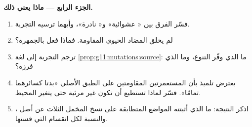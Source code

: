 \begin{problem}
\medskip
\noindent\textbf{الجزء الرابع --- ماذا يعني ذلك.}
\begin{enumerate}[resume]
  \item فسّر الفرق بين « عشوائية» و« نادرة»، وأيهما
        ترسيه التجربة.
  \item لم يخلق المضاد الحيوي المقاومة. فماذا فعل بالجمهرة؟
  \item ترجم التجربة إلى لغة \cref{prop:g11:mutations:source}: ما الذي
        وفّر التنوع، وما الذي فرزه؟
  \item يعترض تلميذ بأن المستعمرتين المقاومتين على الطبق الأصلي «بدتا
        كسائرهما تمامًا». فسّر لماذا تستطيع  أن تكون غير مرئية
        حتى يتغير المحيط.
  \item اذكر النتيجة: ما الذي أثبتته المواضع المتطابقة على نسخ المخمل
        الثلاث عن أصل ، والنسبة لكل انقسام التي قستها.
\end{enumerate}
\end{problem}
